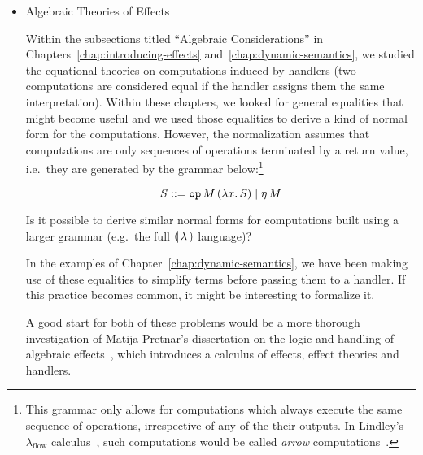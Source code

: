 \begin{itemize}
  In the summary of the last chapter, Subsection~\ref{ssec:conservativity},
  we have claimed that modifying a grammar by inserting handlers for
  effects which are not used anywhere in the grammar has no effect on the
  semantics. Since this claim plays an important part in motivating the use
  of $\calc$, it would be desirable to formalize and prove
  it.\footnote{This might be one of the useful applications of adequacy of
    our denotational semantics. We can prove that
    $\ap{\banana{\onto{\op{new\_op}}{M}}}{N}$ has the same denotation as
    $N$, provided that $\op{new\_op}$ does not occur in the denotation of
    $N$. By using adequacy, we could translate the equality of denotations
    into a reduction in the reduction semantics.}
  

\item Algebraic Theories of Effects

  Within the subsections titled ``Algebraic Considerations'' in
  Chapters~\ref{chap:introducing-effects} and~\ref{chap:dynamic-semantics},
  we studied the equational theories on computations induced by handlers
  (two computations are considered equal if the handler assigns them the
  same interpretation). Within these chapters, we looked for general
  equalities that might become useful and we used those equalities to
  derive a kind of normal form for the computations. However, the
  normalization assumes that computations are only sequences of operations
  terminated by a return value, i.e.\ they are generated by the grammar
  below:\footnote{This grammar only allows for computations which always
    execute the same sequence of operations, irrespective of any of the
    their outputs. In Lindley's $\lambda_{\textrm{flow}}$
    calculus~\cite{lindley2014algebraic}, such computations would be called
    \emph{arrow} computations~\cite{hughes2000generalising}.}

  $$
    S ::= \mathtt{op}\,M\,(\lambda x.\, S) \mid \eta\,M
  $$

  Is it possible to derive similar normal forms for computations built
  using a larger grammar (e.g.\ the full $\calc$ language)?

  In the examples of Chapter~\ref{chap:dynamic-semantics}, we have been
  making use of these equalities to simplify terms before passing them to a
  handler. If this practice becomes common, it might be interesting to
  formalize it.

  A good start for both of these problems would be a more thorough
  investigation of Matija Pretnar's dissertation on the logic and handling
  of algebraic effects~\cite{pretnar2010logic}, which introduces a calculus
  of effects, effect theories and handlers.

  
\end{itemize}


